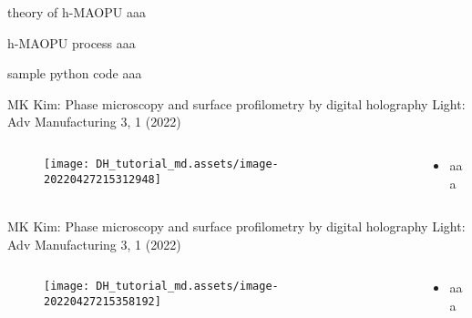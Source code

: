 \documentclass[t, aspectratio=169]{beamer}
\begin{document}
\begin{frame}{theory of h-MAOPU}
aaa
\end{frame}


\begin{frame}{h-MAOPU process}
aaa
\end{frame}


\begin{frame}{sample python code}
aaa
\end{frame}


\begin{frame}{MK Kim: Phase microscopy and surface profilometry by digital holography}
	\vspace{-3 mm}
	\small Light: Adv Manufacturing 3, 1 (2022)
	\begin{columns}
		\begin{column}{.6\textwidth}
			\begin{figure}
				\texttt{[image: DH\_tutorial\_md.assets/image-20220427215312948]}
			\end{figure}
		\end{column}
		\begin{column}{.4\textwidth}
			\begin{itemize}
				\item aaa
			\end{itemize}
		\end{column}
	\end{columns}
\end{frame}


\begin{frame}{MK Kim: Phase microscopy and surface profilometry by digital holography}
	\vspace{-3 mm}
	\small Light: Adv Manufacturing 3, 1 (2022)
	\begin{columns}
		\begin{column}{.6\textwidth}
			\begin{figure}
				\texttt{[image: DH\_tutorial\_md.assets/image-20220427215358192]}
			\end{figure}
		\end{column}
		\begin{column}{.4\textwidth}
			\begin{itemize}
				\item aaa
			\end{itemize}
		\end{column}
	\end{columns}
\end{frame}
\end{document}
